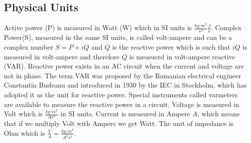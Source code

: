\subsection{Physical Units}
Active power (P) is measured in Watt (W) which in SI units is $\frac{kg \;m^2}{s^3}\frac{J}{s}$. Complex Power(S), measured in the same SI units,  is  called volt-ampere and can be a complex number $S=P+iQ$ and $Q$ is the reactive power which is such that $iQ$ is measured in volt-ampere and therefore $Q$ is measuerd in volt-ampere reactive (VAR). Reactive power exists in an AC circuit when the current and voltage are not in phase. The term VAR was proposed by the Romanian electrical engineer Constantin Budeanu and introduced in 1930 by the IEC in Stockholm, which has adopted it as the unit for reactive power. Special instruments called varmeters are available to measure the reactive power in a circuit. Voltage is measured in Volt which is $\frac{kg\; m^2}{As^3}$ in SI units. Current is measured in Ampere $A$,  which means that if we multiply Volt with Ampere we get Watt. The unit of impedance is Ohm which is $\frac{V}{A}=\frac{kg\; m^2}{A^2s^3}$.

